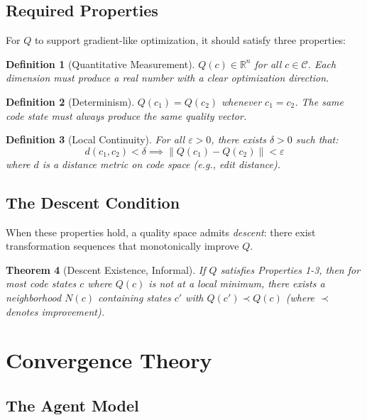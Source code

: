 \documentclass[11pt,a4paper]{article}
\newtheorem{theorem}{Theorem}[section]
\newtheorem{definition}[theorem]{Definition}
\begin{document}
\subsection{Required Properties}

For $Q$ to support gradient-like optimization, it should satisfy three properties:

\begin{definition}[Quantitative Measurement]
$Q(c) \in \mathbb{R}^n$ for all $c \in \mathcal{C}$. Each dimension must produce a real number with a clear optimization direction.
\end{definition}

\begin{definition}[Determinism]
$Q(c_1) = Q(c_2)$ whenever $c_1 = c_2$. The same code state must always produce the same quality vector.
\end{definition}

\begin{definition}[Local Continuity]
For all $\varepsilon > 0$, there exists $\delta > 0$ such that:
\[
d(c_1, c_2) < \delta \implies \|Q(c_1) - Q(c_2)\| < \varepsilon
\]
where $d$ is a distance metric on code space (e.g., edit distance).
\end{definition}

\subsection{The Descent Condition}

When these properties hold, a quality space admits \emph{descent}: there exist transformation sequences that monotonically improve $Q$.

\begin{theorem}[Descent Existence, Informal]
If $Q$ satisfies Properties 1-3, then for most code states $c$ where $Q(c)$ is not at a local minimum, there exists a neighborhood $N(c)$ containing states $c'$ with $Q(c') \prec Q(c)$ (where $\prec$ denotes improvement).
\end{theorem}

\section{Convergence Theory}
\label{sec:convergence}

\subsection{The Agent Model}
\end{document}

